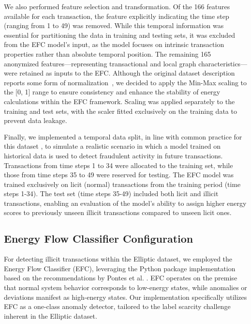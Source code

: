 \documentclass[12pt]{article}
\begin{document}
We also performed feature selection and transformation. Of the 166 features available for each transaction, the feature
explicitly indicating the time step (ranging from 1 to 49) was removed. While this temporal information was essential for
partitioning the data in training and testing sets, it was excluded from the EFC model's input, as the model focuses on
intrinsic transaction properties rather than absolute temporal position. The remaining 165 anonymized features---representing
transactional and local graph characteristics---were retained as inputs to the EFC. Although the original dataset description
reports some form of normalization~\cite{weber2019antimoneylaunderingbitcoinexperimenting}, we decided to apply the Min-Max
scaling to the [0, 1] range to ensure consistency and enhance the stability of energy calculations within the EFC framework.
Scaling was applied separately to the training and test sets, with the scaler fitted exclusively on the training data to
prevent data leakage.

Finally, we implemented a temporal data split, in line with common practice for this dataset 
\cite{weber2019antimoneylaunderingbitcoinexperimenting, lorenz2021machinelearningmethodsdetect}, to simulate a realistic
scenario in which a model trained on historical data is used to detect fraudulent activity in future transactions.
Transactions from time steps 1 to 34 were allocated to the training set, while those from time steps 35 to 49 were reserved
for testing. The EFC model was trained exclusively on licit (normal) transactions from the training period (time steps 1-34).
The test set (time steps 35-49) included both licit and illicit transactions, enabling an evaluation of the model's ability
to assign higher energy scores to previously unseen illicit transactions compared to unseen licit ones.

\subsection{Energy Flow Classifier Configuration} \label{subsec:efc_implementation}

For detecting illicit transactions within the Elliptic dataset, we employed the Energy Flow Classifier (EFC), leveraging
the Python package implementation \cite{efc_package_github} based on the recommendations by Pontes et al.
\cite{pontes2019,souza2022novelopensetenergybased}. EFC operates on the premise that normal system behavior corresponds
to low-energy states, while anomalies or deviations manifest as high-energy states. Our implementation specifically
utilizes EFC as a one-class anomaly detector, tailored to the label scarcity challenge inherent in the Elliptic dataset.
\end{document}
